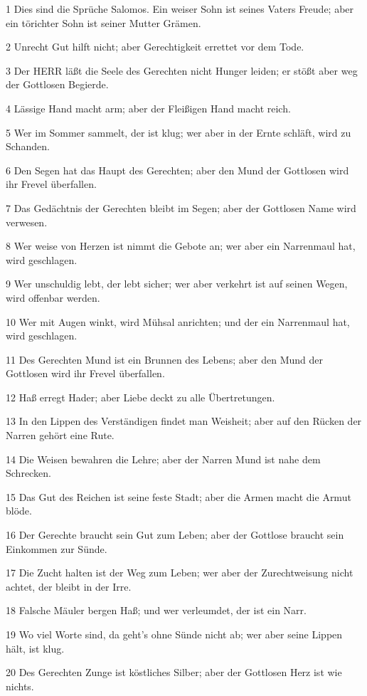 \par 1 Dies sind die Sprüche Salomos. Ein weiser Sohn ist seines Vaters Freude; aber ein törichter Sohn ist seiner Mutter Grämen.
\par 2 Unrecht Gut hilft nicht; aber Gerechtigkeit errettet vor dem Tode.
\par 3 Der HERR läßt die Seele des Gerechten nicht Hunger leiden; er stößt aber weg der Gottlosen Begierde.
\par 4 Lässige Hand macht arm; aber der Fleißigen Hand macht reich.
\par 5 Wer im Sommer sammelt, der ist klug; wer aber in der Ernte schläft, wird zu Schanden.
\par 6 Den Segen hat das Haupt des Gerechten; aber den Mund der Gottlosen wird ihr Frevel überfallen.
\par 7 Das Gedächtnis der Gerechten bleibt im Segen; aber der Gottlosen Name wird verwesen.
\par 8 Wer weise von Herzen ist nimmt die Gebote an; wer aber ein Narrenmaul hat, wird geschlagen.
\par 9 Wer unschuldig lebt, der lebt sicher; wer aber verkehrt ist auf seinen Wegen, wird offenbar werden.
\par 10 Wer mit Augen winkt, wird Mühsal anrichten; und der ein Narrenmaul hat, wird geschlagen.
\par 11 Des Gerechten Mund ist ein Brunnen des Lebens; aber den Mund der Gottlosen wird ihr Frevel überfallen.
\par 12 Haß erregt Hader; aber Liebe deckt zu alle Übertretungen.
\par 13 In den Lippen des Verständigen findet man Weisheit; aber auf den Rücken der Narren gehört eine Rute.
\par 14 Die Weisen bewahren die Lehre; aber der Narren Mund ist nahe dem Schrecken.
\par 15 Das Gut des Reichen ist seine feste Stadt; aber die Armen macht die Armut blöde.
\par 16 Der Gerechte braucht sein Gut zum Leben; aber der Gottlose braucht sein Einkommen zur Sünde.
\par 17 Die Zucht halten ist der Weg zum Leben; wer aber der Zurechtweisung nicht achtet, der bleibt in der Irre.
\par 18 Falsche Mäuler bergen Haß; und wer verleumdet, der ist ein Narr.
\par 19 Wo viel Worte sind, da geht's ohne Sünde nicht ab; wer aber seine Lippen hält, ist klug.
\par 20 Des Gerechten Zunge ist köstliches Silber; aber der Gottlosen Herz ist wie nichts.
